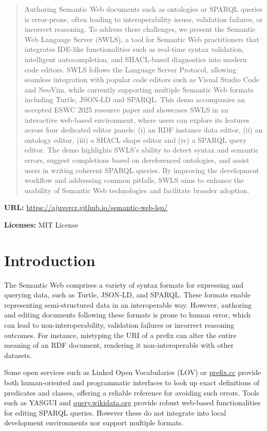 
\begin{abstract}
  Authoring Semantic Web documents such as ontologies or SPARQL queries is error-prone, often leading to interoperability issues, validation failures, or incorrect reasoning.
  To address these challenges, we present the Semantic Web Language Server (SWLS), a tool for Semantic Web practitioners that integrates IDE-like functionalities such as real-time syntax validation, intelligent autocompletion, and SHACL-based diagnostics into modern code editors.
  SWLS follows the Language Server Protocol, allowing seamless integration with popular code editors such as Visual Studio Code and NeoVim, while currently supporting multiple Semantic Web formats including Turtle, JSON-LD and SPARQL.
  This demo accompanies an accepted ESWC 2025 resource paper and showcases SWLS in an interactive web-based environment, where users can explore its features across four dedicated editor panels: (i) an RDF instance data editor, (ii) an ontology editor, (iii) a SHACL shape editor and (iv) a SPARQL query editor. 
  The demo highlights SWLS’s ability to detect syntax and semantic errors, suggest completions based on dereferenced ontologies, and assist users in writing coherent SPARQL queries.
  By improving the development workflow and addressing common pitfalls, SWLS aims to enhance the usability of Semantic Web technologies and facilitate broader adoption.
\end{abstract}

\textbf{URL:} \url{https://ajuvercr.github.io/semantic-web-lsp/} 

\textbf{Licenses:} MIT License


\section{Introduction}%
\label{sec:introduction}

The Semantic Web comprises a variety of syntax formats for expressing and querying data, such as Turtle, JSON-LD, and SPARQL. 
These formats enable representing semi-structured data in an interoperable way.
However, authoring and editing documents following these formats is prone to human error, which can lead to non-interoperability, validation failures or incorrect reasoning outcomes.
For instance, mistyping the URI of a prefix can alter the entire meaning of an RDF document, rendering it non-interoperable with other datasets. 

Some open services such as Linked Open Vocabularies (LOV)\cite{LOV2017} or \href{https://prefix.cc}{prefix.cc} provide both human-oriented and programmatic interfaces to look up exact definitions of predicates and classes, offering a reliable reference for avoiding such errors.
Tools such as YASGUI\cite{yasgui,10.1007/978-3-642-41242-4_7} and \href{https://query.wikidata.org/}{query.wikidata.org} provide robust web-based functionalities for editing SPARQL queries.
However these do not integrate into local development environments nor support multiple formats.

